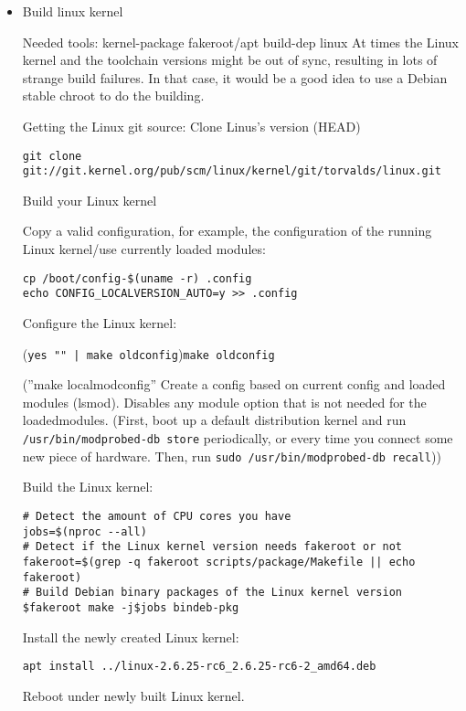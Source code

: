 \begin{itemize}

\item Build linux kernel

Needed tools: kernel-package fakeroot/apt build-dep linux
At times the Linux kernel and the toolchain versions might be out of sync, resulting in lots of strange build failures. In that case, it would be a good idea to use a Debian stable chroot to do the building.

Getting the Linux git source: Clone Linus's version (HEAD)
\begin{lstlisting}
git clone git://git.kernel.org/pub/scm/linux/kernel/git/torvalds/linux.git
\end{lstlisting}

Build your Linux kernel

Copy a valid configuration, for example, the configuration of the running Linux kernel/use currently loaded modules:

\begin{lstlisting}
cp /boot/config-$(uname -r) .config
echo CONFIG_LOCALVERSION_AUTO=y >> .config
\end{lstlisting}

Configure the Linux kernel:

(\verb=yes "" | make oldconfig=)\verb=make oldconfig=

(''make localmodconfig'' Create a config based on current config and loaded modules (lsmod). Disables any module option that is not needed for the loadedmodules. (First, boot up a default distribution kernel and run \verb=/usr/bin/modprobed-db store= periodically, or every time you connect some new piece of hardware. Then, run \verb=sudo /usr/bin/modprobed-db recall=))

Build the Linux kernel:

\begin{lstlisting}
# Detect the amount of CPU cores you have
jobs=$(nproc --all)
# Detect if the Linux kernel version needs fakeroot or not
fakeroot=$(grep -q fakeroot scripts/package/Makefile || echo fakeroot)
# Build Debian binary packages of the Linux kernel version
$fakeroot make -j$jobs bindeb-pkg
\end{lstlisting}

Install the newly created Linux kernel:
\begin{lstlisting}
apt install ../linux-2.6.25-rc6_2.6.25-rc6-2_amd64.deb
\end{lstlisting}

Reboot under newly built Linux kernel.


\end{itemize}
